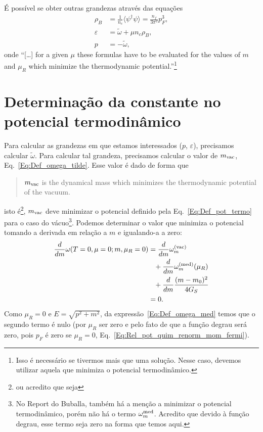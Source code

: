 É possível se obter outras grandezas através das equações
\begin{align}
	\rho_B &= \frac{1}{n_c} \langle\psi^\dagger\psi\rangle = \frac{n_f}{3\pi^2}p_F^3, \label{Eq:Rel_Dens_Mom_Fermi_NJL}\\
	\varepsilon &= \tilde{\omega} + \mu n_c \rho_B, \label{Eq:Energia_omega_tilde}\\
	p &= - \tilde{\omega}, \label{Eq:Pressao_omega_tilde}
\end{align}
%
onde ``[\dots] for a given $\mu$ these formulas have to be evaluated for the values of $m$ and $\mu_R$ which minimize the thermodynamic potential.''\footnote{Isso é necessário se tivermos mais que uma solução. Nesse caso, devemos utilizar aquela que minimiza o potencial termodinâmico.}

\section{Determinação da constante no potencial termodinâmico}
\label{Sec:M_vac}

Para calcular as grandezas em que estamos interessados ($p$, $\varepsilon$), precisamos calcular $\tilde{\omega}$. Para calcular tal grandeza, precisamos calcular o valor de $m_{\rm{vac}}$, Eq.~\eqref{Eq:Def_omega_tilde}. Esse valor é dado de forma que\cite{Buballa1996}
\begin{quote}
	$m_{\rm{vac}}$ is the dynamical mass which minimizes the thermodynamic potential of the vacuum.
\end{quote}
%
isto é\footnote{ou acredito que seja}, $m_{\rm{vac}}$ deve minimizar o potencial definido pela Eq.~\ref{Eq:Def_pot_termo} para o caso do vácuo\footnote{No Report do Buballa, também há a menção a minimizar o potencial termodinâmico, porém não há o termo $\omega_m^{\rm{med}}$. Acredito que devido à função degrau, esse termo seja zero na forma que temos aqui.}. Podemos determinar o valor que minimiza o potencial tomando a derivada em relação a $m$ e igualando-a a zero:
\begin{align}
	\frac{d}{dm} \omega(T = 0,\mu = 0; m, \mu_R = 0) &= \frac{d}{dm}\omega_m^{\rm{(vac)}} \\
	&\phantom{=} + \frac{d}{dm}\omega_m^{\rm{(med)}}(\mu_R) \nonumber \\
	&\phantom{=} + \frac{d}{dm}\frac{(m - m_0)^2}{4G_S} \nonumber \\
	&= 0.\nonumber
\end{align}
%
Como $\mu_R = 0$ e $E = \sqrt{p^2+m^2}$, da expressão~\eqref{Eq:Def_omega_med} temos que o segundo termo é nulo (por $\mu_R$ ser zero e pelo fato de que a função degrau será zero, pois $p_F$ é zero se $\mu_R = 0$, Eq.~\eqref{Eq:Rel_pot_quim_renorm_mom_fermi}).

